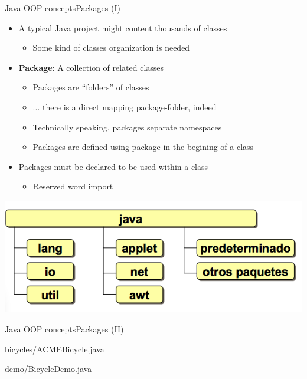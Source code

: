 \documentclass[10pt,compress]{beamer} %
\begin{document}
\begin{frame}{Java OOP concepts}{Packages (I)}
	\begin{itemize}
	\item A typical Java project might content thousands of classes
		\begin{itemize}
		\item Some kind of classes organization is needed
		\end{itemize}
	\item \textbf{Package}: A collection of related classes
		\begin{itemize}
		\item Packages are ``folders'' of classes
		\item ... there is a direct mapping package-folder, indeed
		\item Technically speaking, packages separate namespaces
		\item Packages are defined using \alert{package} in the begining of a class
		\end{itemize}
	\item Packages must be declared to be used within a class
		\begin{itemize}
		\item Reserved word \alert{import}
		\end{itemize}
	\end{itemize}
	\centering \includegraphics[width=0.5\linewidth]{figs/paquetesJava.png}\\
\end{frame}

\begin{frame}{Java OOP concepts}{Packages (II)}
	\vspace{-0.2cm}
	\begin{block}{bicycles/ACMEBicycle.java}
	\vspace{-0.2cm}
		
		\vspace{-0.2cm}
	\end{block}
	\begin{block}{demo/BicycleDemo.java}
	\vspace{-0.2cm}
		
		\vspace{-0.2cm}
	\end{block}
\end{frame}
\end{document}
